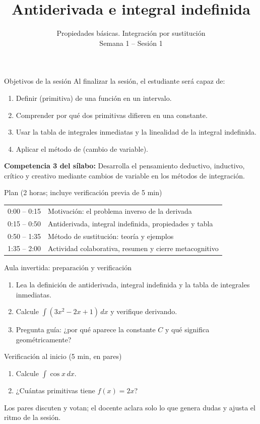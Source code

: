 \documentclass[10pt,aspectratio=169]{beamer}
\title[Antiderivada e integral indefinida]{Antiderivada e integral indefinida}
\subtitle{Propiedades básicas. Integración por sustitución\\[2pt]\small Semana 1 -- Sesión 1}
\begin{document}
\begin{frame}
  \titlepage
\end{frame}

\begin{frame}{Objetivos de la sesión}
  Al finalizar la sesión, el estudiante será capaz de:
  \begin{enumerate}
    \item Definir  (primitiva) de una función en un intervalo.
    \item Comprender por qué dos primitivas difieren en una constante.
    \item Usar la tabla de integrales inmediatas y la linealidad de la integral indefinida.
    \item Aplicar el método de  (cambio de variable).
  \end{enumerate}
  \vspace{2mm}
  \vspace{1mm}
  {\small\textbf{Competencia 3 del sílabo:} Desarrolla el pensamiento deductivo, inductivo, crítico y creativo mediante cambios de variable en los métodos de integración.}
  \begin{block}{Plan (2 horas; incluye verificación previa de 5 min)}
    \begin{tabular}{ll}
      0:00 -- 0:15 & Motivación: el problema inverso de la derivada\\
      0:15 -- 0:50 & Antiderivada, integral indefinida, propiedades y tabla\\
      0:50 -- 1:35 & Método de sustitución: teoría y ejemplos\\
      1:35 -- 2:00 & Actividad colaborativa, resumen y cierre metacognitivo
    \end{tabular}
  \end{block}
\end{frame}

\begin{frame}{Aula invertida: preparación y verificación}
  \small
  \begin{previa}
    \begin{enumerate}
      \item Lea la definición de antiderivada, integral indefinida y la tabla de integrales inmediatas.
      \item Calcule $\int(3x^2-2x+1)\,dx$ y verifique derivando.
      \item Pregunta guía: ¿por qué aparece la constante $C$ y qué significa geométricamente?
    \end{enumerate}
  \end{previa}
  \begin{block}{Verificación al inicio (5 min, en pares)}
    \begin{enumerate}
      \item Calcule $\int\cos x\,dx$.
      \item ¿Cuántas primitivas tiene $f(x)=2x$?
    \end{enumerate}
    Los pares discuten y votan; el docente aclara solo lo que genera dudas y ajusta el ritmo de la sesión.
  \end{block}
\end{frame}
\end{document}
